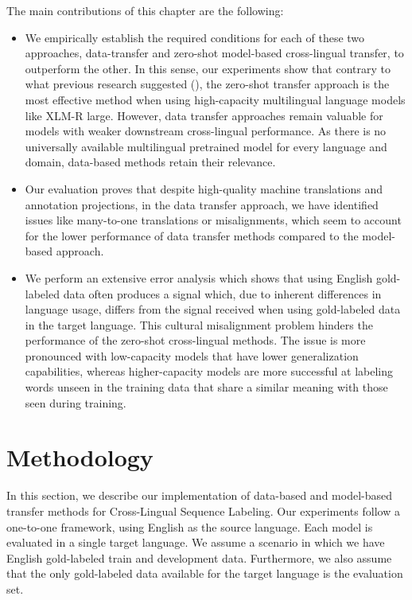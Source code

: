 The main contributions of this chapter are the following: 
\begin{itemize}
\item We empirically establish the required conditions for each of these two approaches, data-transfer and zero-shot model-based cross-lingual transfer, to outperform the other. In this sense, our experiments show that contrary to what previous research suggested (\cite{fei-etal-2020-cross,Li2021CrossLingualNE}), the zero-shot transfer approach is the most effective method when using high-capacity multilingual language models like XLM-R large. However, data transfer approaches remain valuable for models with weaker downstream cross-lingual performance. As there is no universally available multilingual pretrained model for every language and domain, data-based methods retain their relevance.
\item Our evaluation proves that despite high-quality machine translations and annotation projections, in the data transfer approach, we have identified issues like many-to-one translations or misalignments, which seem to account for the lower performance of data transfer methods compared to the model-based approach.
\item We perform an extensive error analysis which shows that using English gold-labeled data often produces a signal which, due to inherent differences in language usage, differs from the signal received when using gold-labeled data in the target language. This cultural misalignment problem hinders the performance of the zero-shot cross-lingual methods. The issue is more pronounced with low-capacity models that have lower generalization capabilities, whereas higher-capacity models are more successful at labeling words unseen in the training data that share a similar meaning with those seen during training.

\end{itemize}




\section{Methodology}
In this section, we describe our implementation of data-based and model-based transfer methods for Cross-Lingual Sequence Labeling. Our experiments follow a one-to-one framework, using English as the source language. Each model is evaluated in a single target language. We assume a scenario in which we have English gold-labeled train and development data. Furthermore, we also assume that the only gold-labeled data available for the target language is the evaluation set. 


